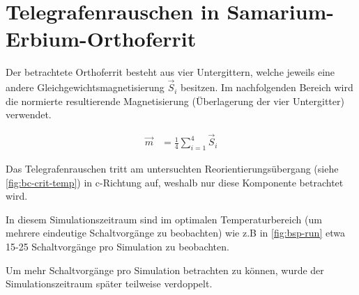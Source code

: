\documentclass[main.tex]{subfiles}
\begin{document}
\newpage
\section{Telegrafenrauschen in Samarium-Erbium-Orthoferrit}



Der betrachtete Orthoferrit besteht aus vier Untergittern, welche jeweils eine andere Gleichgewichtsmagnetisierung \(\vec{S}_i\) besitzen. Im nachfolgenden Bereich wird die normierte resultierende Magnetisierung (Überlagerung der vier Untergitter) verwendet.

\begin{align}
    \vec{m} &= \frac{1}{4} \sum_{i=1}^4 \vec{S}_i
\end{align}

Das Telegrafenrauschen tritt am untersuchten Reorientierungsübergang (siehe \cref{fig:bc-crit-temp}) in c-Richtung auf, weshalb nur diese Komponente betrachtet wird.


In diesem Simulationszeitraum sind im optimalen Temperaturbereich (um mehrere eindeutige Schaltvorgänge zu beobachten) wie z.B  in \cref{fig:bsp-run} etwa 15-25 Schaltvorgänge pro Simulation zu beobachten.

Um mehr Schaltvorgänge pro Simulation betrachten zu können, wurde der Simulationszeitraum später teilweise verdoppelt.
\end{document}
